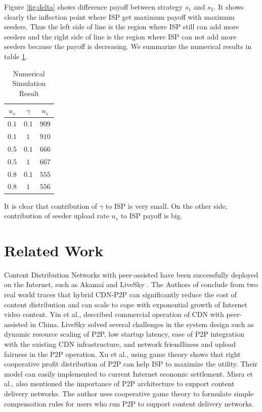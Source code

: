 \documentclass[paper]{ieice}
\begin{document}
Figure \ref{fig:delta} shows difference payoff between strategy $s_1$ and $s_2$.
It shows clearly the inflection point where ISP get maximum payoff with maximum seeders. 
Thus the left side of line is the region where ISP still can add more seeders and the right side of line is the region where ISP can not add more seeders because the payoff is decreasing.
We summarize the numerical results in table \ref{table:2}.
\begin{table}[hb]%
\caption{Numerical Simulation Result}
\label{table:2}
\begin{center}
\begin{tabular}{c|c|c}
\hline
$u_s$ & $\gamma$ & $n_s$ \\
\hline
$0.1$ & $0.1$ & $909$ \\
\hline
$0.1$ & $1$ & $910$ \\
\hline
$0.5$ & $0.1$ & $666$ \\
\hline
$0.5$ & $1$ & $667$\\
\hline
$0.8$ & $0.1$ & $555$ \\
\hline
$0.8$ & $1$ & $556$ \\
\hline
\end{tabular}
\end{center}
\end{table}
It is clear that contribution of $\gamma$ to ISP is very small.
On the other side, contribution of seeder upload rate $u_s$ to ISP payoff is big.



\section{Related Work} 
Content Distribution Networks with peer-assisted have been successfully deployed on the Internet, such as Akamai \cite{Huang:2008:UHC:1496046.1496064} and LiveSky \cite{Yin:2010:LEC:1823746.1823750}.
The Authors of \cite{Huang:2008:UHC:1496046.1496064} conclude from two real world traces  that hybrid CDN-P2P can significantly reduce the cost of content distribution and can scale to cope with exponential growth of Internet video content.
Yin et al., \cite{Yin:2010:LEC:1823746.1823750} described commercial operation of CDN with peer-assisted in China.   
LiveSky solved several challenges in the system design such as dynamic resource scaling of P2P, low startup latency, ease of P2P integration with the existing CDN infrastructure, and network friendliness and upload fairness in the P2P operation. 
Xu et al.,\cite{DBLP:journals/corr/abs-1212-4915} using game theory shows that right cooperative profit distribution of P2P can help ISP to maximize the utility. 
Their model can easily implemented to current Internet economic settlement.
Misra et al.,\cite{Misra:2010:IPS:1811099.1811064} also mentioned the importance of P2P architecture to support content delivery networks. 
The author uses cooperative game theory to formulate simple compensation rules for users who run P2P to support content delivery networks.  
\end{document}

